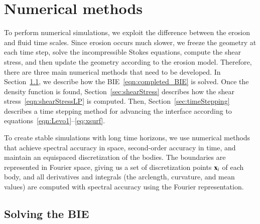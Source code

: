 \documentclass[preprint, 10pt]{elsarticle}
\begin{document}
\section{Numerical methods}
\label{s:method}
To perform numerical simulations, we exploit the difference between the erosion and fluid time scales.  Since erosion occurs much slower, we freeze the geometry at each time step, solve the incompressible Stokes equations, compute the shear stress, and then update the geometry according to the erosion model.  Therefore, there are three main numerical methods that need to be developed.  In Section~\ref{sec:BIE}, we describe how the BIE~\eqref{eqn:completed_BIE} is solved.  Once the density function is found, Section~\ref{sec:shearStress} describes how the shear stress~\eqref{eqn:shearStressLP} is computed.  Then, Section~\ref{sec:timeStepping} describes a time stepping method for advancing the interface according to equations~\eqref{eqn:Levo1}--\eqref{eq:xsurf}. 

To create stable simulations with long time horizons, we use numerical methods that achieve spectral accuracy in space, second-order accuracy in time, and maintain an equispaced discretization of the bodies.  The boundaries are represented in Fourier space, giving us a set of discretization points ${\mathbf{x}}_i$ of each body, and all derivatives and integrals (the arclength, curvature, and mean values) are computed with spectral accuracy using the Fourier representation.

\subsection{Solving the BIE}
\label{sec:BIE}
\end{document}
